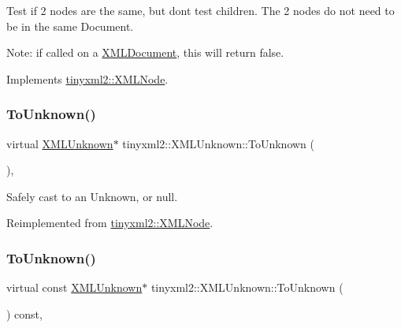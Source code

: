 Test if 2 nodes are the same, but don\textquotesingle{}t test children. The 2 nodes do not need to be in the same Document.

Note\+: if called on a \hyperlink{classtinyxml2_1_1_x_m_l_document}{X\+M\+L\+Document}, this will return false. 

Implements \hyperlink{classtinyxml2_1_1_x_m_l_node_a7ce18b751c3ea09eac292dca264f9226}{tinyxml2\+::\+X\+M\+L\+Node}.

\mbox{\label{classtinyxml2_1_1_x_m_l_unknown_af4374856421921cad578c8affae872b6}} 
\subsubsection{\texorpdfstring{To\+Unknown()}{ToUnknown()}\hspace{0.1cm}{\footnotesize\ttfamily [1/2]}}
{\footnotesize\ttfamily virtual \hyperlink{classtinyxml2_1_1_x_m_l_unknown}{X\+M\+L\+Unknown}$\ast$ tinyxml2\+::\+X\+M\+L\+Unknown\+::\+To\+Unknown (\begin{DoxyParamCaption}{ }\end{DoxyParamCaption})\hspace{0.3cm}{\ttfamily [inline]}, {\ttfamily [virtual]}}



Safely cast to an Unknown, or null. 



Reimplemented from \hyperlink{classtinyxml2_1_1_x_m_l_node_a8675a74aa0ada6eccab0c77ef3e5b9bd}{tinyxml2\+::\+X\+M\+L\+Node}.

\mbox{\label{classtinyxml2_1_1_x_m_l_unknown_a61b342b4f295cded1dc2f4402e97f07e}} 
\subsubsection{\texorpdfstring{To\+Unknown()}{ToUnknown()}\hspace{0.1cm}{\footnotesize\ttfamily [2/2]}}
{\footnotesize\ttfamily virtual const \hyperlink{classtinyxml2_1_1_x_m_l_unknown}{X\+M\+L\+Unknown}$\ast$ tinyxml2\+::\+X\+M\+L\+Unknown\+::\+To\+Unknown (\begin{DoxyParamCaption}{ }\end{DoxyParamCaption}) const\hspace{0.3cm}{\ttfamily [inline]}, {\ttfamily [virtual]}}



